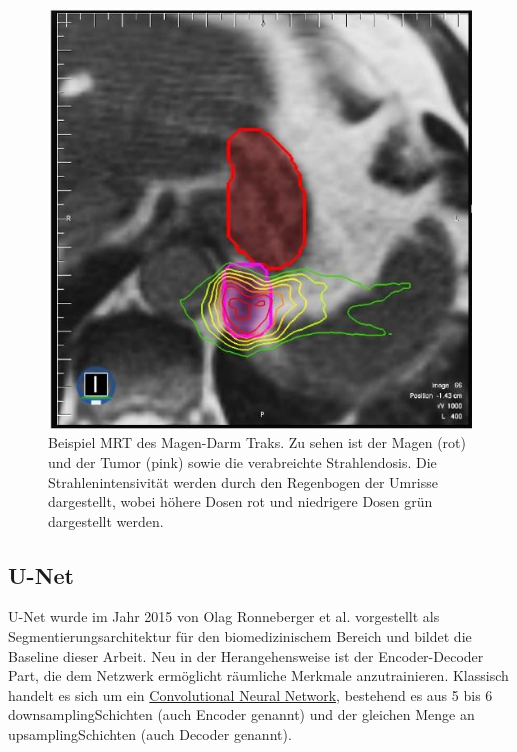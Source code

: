 \begin{figure}[htb]
	\begin{center}
		\includegraphics[width=450pt]{bilder/magen-mrt}
		\caption{Beispiel MRT des Magen-Darm Traks. Zu sehen ist der Magen (rot) und der Tumor (pink) sowie die verabreichte Strahlendosis. Die Strahlenintensivität werden durch den Regenbogen der Umrisse dargestellt, wobei höhere Dosen rot und niedrigere Dosen grün dargestellt werden.}\label{magen-mrt}
	\end{center}
\end{figure}

\subsection{U-Net}

U-Net wurde im Jahr 2015 von Olag Ronneberger et al. \citep{U-Net} vorgestellt als Segmentierungsarchitektur für den biomedizinischem Bereich und bildet die Baseline dieser Arbeit. Neu in der Herangehensweise ist der Encoder-Decoder Part, die dem Netzwerk ermöglicht räumliche Merkmale anzutrainieren.
Klassisch handelt es sich um ein
\href{https://en.wikipedia.org/wiki/Convolutional_neural_network}{Convolutional Neural Network}, bestehend es aus 5 bis 6 \glqq downsampling\grqq Schichten (auch Encoder genannt)  und der gleichen Menge an \glqq upsampling\grqq Schichten (auch Decoder genannt).

